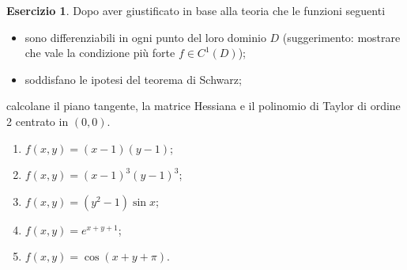 \documentclass[12pt,a4paper]{article}
\theoremstyle{definition}
\newtheorem{exe}{Esercizio}
\begin{document}
\begin{exe}
    Dopo aver giustificato in base alla teoria che le funzioni seguenti
    \begin{itemize}
        \item sono differenziabili in ogni punto del loro dominio $D$ (suggerimento: mostrare che vale la condizione più forte $f \in C^1(D)$);
        \item soddisfano le ipotesi del teorema di Schwarz;
    \end{itemize}
    calcolane il piano tangente, la matrice Hessiana e il polinomio di Taylor di ordine 2 centrato in $(0,0)$.
    \begin{enumerate}
        \item $f(x,y) = (x-1)(y-1)$;
        \item $f(x,y) = (x-1)^3 (y-1)^3$;
        \item $f(x,y) = (y^2 - 1) \sin x$;
        \item $f(x,y) = e^{x+y+1}$;
        \item $f(x,y) = \cos(x+y+\pi)$.
    \end{enumerate}
\end{exe}
\end{document}
